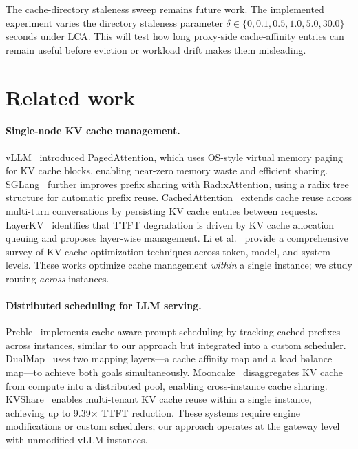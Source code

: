 \documentclass{article}
\begin{document}
The cache-directory staleness sweep remains future work. The implemented experiment varies the directory staleness parameter $\delta \in \{0, 0.1, 0.5, 1.0, 5.0, 30.0\}$ seconds under LCA. This will test how long proxy-side cache-affinity entries can remain useful before eviction or workload drift makes them misleading.

\section{Related work}
\label{sec:related}

\paragraph{Single-node KV cache management.}
vLLM~\citep{kwon2023pagedattention} introduced PagedAttention, which uses OS-style virtual memory paging for KV cache blocks, enabling near-zero memory waste and efficient sharing. SGLang~\citep{zheng2024sglang} further improves prefix sharing with RadixAttention, using a radix tree structure for automatic prefix reuse. CachedAttention~\citep{gao2024cachedattention} extends cache reuse across multi-turn conversations by persisting KV cache entries between requests. LayerKV~\citep{xiong2024layerkv} identifies that TTFT degradation is driven by KV cache allocation queuing and proposes layer-wise management. Li et al.~\citep{li2024kvcache_survey} provide a comprehensive survey of KV cache optimization techniques across token, model, and system levels. These works optimize cache management \emph{within} a single instance; we study routing \emph{across} instances.

\paragraph{Distributed scheduling for LLM serving.}
Preble~\citep{tao2024preble} implements cache-aware prompt scheduling by tracking cached prefixes across instances, similar to our approach but integrated into a custom scheduler. DualMap~\citep{zhu2025dualmap} uses two mapping layers---a cache affinity map and a load balance map---to achieve both goals simultaneously. Mooncake~\citep{qin2025mooncake} disaggregates KV cache from compute into a distributed pool, enabling cross-instance cache sharing. KVShare~\citep{yang2025kvshare} enables multi-tenant KV cache reuse within a single instance, achieving up to 9.39$\times$ TTFT reduction. These systems require engine modifications or custom schedulers; our approach operates at the gateway level with unmodified vLLM instances.
\end{document}
